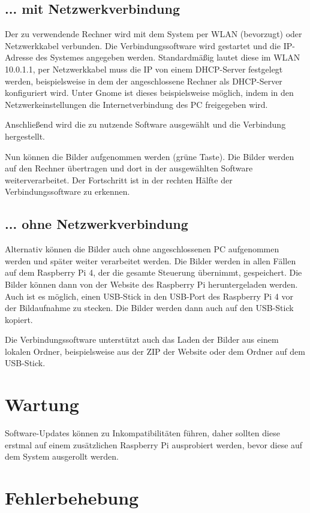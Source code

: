 \documentclass[./00PhotoBox.tex]{subfiles}
\begin{document}
\subsection{... mit Netzwerkverbindung}
Der zu verwendende Rechner wird mit dem System per WLAN (bevorzugt) oder Netzwerkkabel verbunden. Die Verbindungssoftware wird gestartet und die IP-Adresse des Systemes angegeben werden. Standardmäßig lautet diese im WLAN 10.0.1.1, per Netzwerkkabel muss die IP von einem DHCP-Server festgelegt werden, beispielsweise in dem der angeschlossene Rechner als DHCP-Server konfiguriert wird. Unter Gnome ist dieses beispielsweise möglich, indem in den Netzwerkeinstellungen die Internetverbindung des PC freigegeben wird.

Anschließend wird die zu nutzende Software ausgewählt und die Verbindung hergestellt.

Nun können die Bilder aufgenommen werden (grüne Taste). Die Bilder werden auf den Rechner übertragen und dort in der ausgewählten Software weiterverarbeitet. Der Fortschritt ist in der rechten Hälfte der Verbindungssoftware zu erkennen.

\subsection{... ohne Netzwerkverbindung}
Alternativ können die Bilder auch ohne angeschlossenen PC aufgenommen werden und später weiter verarbeitet werden. Die Bilder werden in allen Fällen auf dem Raspberry Pi 4, der die gesamte Steuerung übernimmt, gespeichert. Die Bilder können dann von der Website des Raspberry Pi heruntergeladen werden. Auch ist es möglich, einen USB-Stick in den USB-Port des Raspberry Pi 4 vor der Bildaufnahme zu stecken. Die Bilder werden dann auch auf den USB-Stick kopiert.

Die Verbindungssoftware unterstützt auch das Laden der Bilder aus einem lokalen Ordner, beispielsweise aus der ZIP der Website oder dem Ordner auf dem USB-Stick.

\section{Wartung}
Software-Updates können zu Inkompatibilitäten führen, daher sollten diese erstmal auf einem zusätzlichen Raspberry Pi ausprobiert werden, bevor diese auf dem System ausgerollt werden.

\section{Fehlerbehebung}
\label{sec:Fehlerbehebung}
\end{document}
